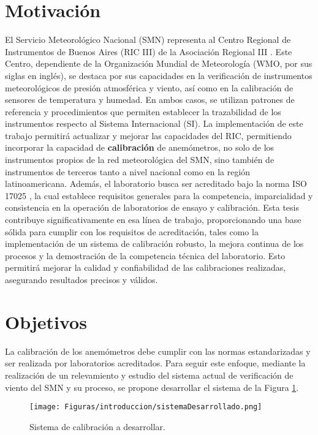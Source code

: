 \section{Motivación}\label{sec:motivacion}

El Servicio Meteorológico Nacional (SMN) representa al Centro Regional de Instrumentos de Buenos Aires (RIC III) de la Asociación Regional III \cite{RIC_Argentina}. Este Centro, dependiente de la Organización Mundial de Meteorología (WMO, por sus siglas en inglés), se destaca por sus capacidades en la verificación de instrumentos meteorológicos de presión atmosférica y viento, así como en la calibración de sensores de temperatura y humedad. En ambos casos, se utilizan patrones de referencia y procedimientos que permiten establecer la trazabilidad de los instrumentos respecto al Sistema Internacional (SI). La implementación de este trabajo permitirá actualizar y mejorar las capacidades del RIC, permitiendo incorporar la capacidad de \textbf{calibración} de anemómetros, no solo de los instrumentos propios de la red meteorológica del SMN, sino también de instrumentos de terceros tanto a nivel nacional como en la región latinoamericana.  Además, el laboratorio busca ser acreditado bajo la norma ISO 17025 \cite{ISO17025}, la cual establece requisitos generales para la competencia, imparcialidad y consistencia en la operación de laboratorios de ensayo y calibración. Esta tesis contribuye significativamente en esa línea de trabajo, proporcionando una base sólida para cumplir con los requisitos de acreditación, tales como la implementación de un sistema de calibración robusto, la mejora continua de los procesos y la demostración de la competencia técnica del laboratorio. Esto permitirá mejorar la calidad y confiabilidad de las calibraciones realizadas, asegurando resultados precisos y válidos.

\section{Objetivos}\label{sec:objetivos}

La calibración de los anemómetros debe cumplir con las normas estandarizadas  \cite{ISO16622} \cite{ISO17713-1} \cite{IEC61400-12-1} y ser realizada por laboratorios acreditados. Para seguir este enfoque, mediante la realización de un relevamiento y estudio del sistema actual de verificación de viento del SMN y su proceso, se propone desarrollar el sistema de la Figura \ref{fig:sistemaDesarrollado}.

\begin{figure}[H]
    \centering
    \texttt{[image: Figuras/introduccion/sistemaDesarrollado.png]}
    \caption{Sistema de calibración a desarrollar.} 
    \label{fig:sistemaDesarrollado}
\end{figure}

